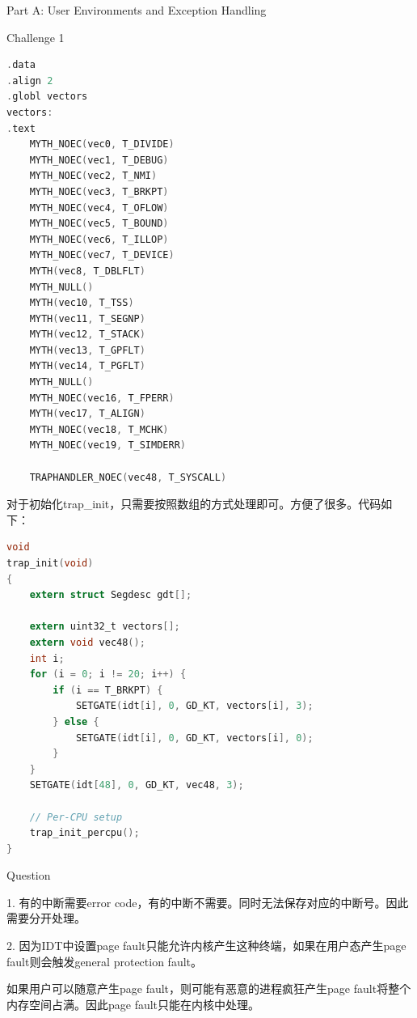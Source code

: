 \documentclass[GBK,winfonts,a4paper,10pt]{ctexart}
\begin{document}
\begin{section}{ Part A: User Environments and Exception Handling }
\begin{subsection}{ Challenge 1 }
\begin{lstlisting}[language=C]
.data
.align 2
.globl vectors
vectors:
.text
	MYTH_NOEC(vec0, T_DIVIDE)
 	MYTH_NOEC(vec1, T_DEBUG)
 	MYTH_NOEC(vec2, T_NMI)
 	MYTH_NOEC(vec3, T_BRKPT)
 	MYTH_NOEC(vec4, T_OFLOW)
 	MYTH_NOEC(vec5, T_BOUND)
 	MYTH_NOEC(vec6, T_ILLOP)
	MYTH_NOEC(vec7, T_DEVICE)
 	MYTH(vec8, T_DBLFLT)
 	MYTH_NULL()
 	MYTH(vec10, T_TSS)
 	MYTH(vec11, T_SEGNP)
 	MYTH(vec12, T_STACK)
 	MYTH(vec13, T_GPFLT)
 	MYTH(vec14, T_PGFLT) 
 	MYTH_NULL()
 	MYTH_NOEC(vec16, T_FPERR)
 	MYTH(vec17, T_ALIGN)
 	MYTH_NOEC(vec18, T_MCHK)
 	MYTH_NOEC(vec19, T_SIMDERR)
  	
    TRAPHANDLER_NOEC(vec48, T_SYSCALL)
\end{lstlisting}
\par
对于初始化trap\_init，只需要按照数组的方式处理即可。方便了很多。代码如下：
\par
\begin{lstlisting}[language=C]
void
trap_init(void)
{
	extern struct Segdesc gdt[];
    
    extern uint32_t vectors[];
    extern void vec48();
    int i;
    for (i = 0; i != 20; i++) {
    	if (i == T_BRKPT) {
    		SETGATE(idt[i], 0, GD_KT, vectors[i], 3);
    	} else {
    		SETGATE(idt[i], 0, GD_KT, vectors[i], 0);
    	}
    }
    SETGATE(idt[48], 0, GD_KT, vec48, 3);

	// Per-CPU setup 
	trap_init_percpu();
}
\end{lstlisting}
\end{subsection}

\begin{subsection}{ Question }
\par
1. 有的中断需要error code，有的中断不需要。同时无法保存对应的中断号。因此需要分开处理。
\par
2. 因为IDT中设置page fault只能允许内核产生这种终端，如果在用户态产生page fault则会触发general protection fault。
\par
如果用户可以随意产生page fault，则可能有恶意的进程疯狂产生page fault将整个内存空间占满。因此page fault只能在内核中处理。
\end{subsection}
\end{section}
\end{document}
